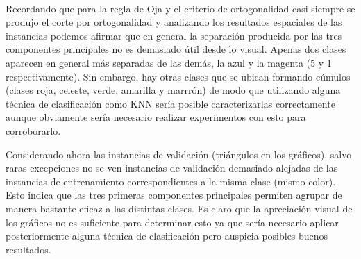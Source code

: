 \documentclass[informe.tex]{subfiles}
\begin{document}
	~
	
	Recordando que para la regla de Oja y el criterio de ortogonalidad casi siempre se produjo el corte por ortogonalidad y analizando los resultados espaciales de las instancias podemos afirmar que en general la separación producida por las tres componentes principales no es demasiado útil desde lo visual. Apenas dos clases aparecen en general más separadas de las demás, la azul y la magenta (5 y 1 respectivamente). Sin embargo, hay otras clases que se ubican formando cúmulos (clases roja, celeste, verde, amarilla y marrrón) de modo que utilizando alguna técnica de clasificación como KNN sería posible caracterizarlas correctamente aunque obviamente sería necesario realizar experimentos con esto para corroborarlo.
	
	Considerando ahora las instancias de validación (triángulos en los gráficos), salvo raras excepciones no se ven instancias de validación demasiado alejadas de las instancias de entrenamiento correspondientes a la misma clase (mismo color). Esto indica que las tres primeras componentes principales permiten agrupar de manera bastante eficaz a las distintas clases. Es claro que la apreciación visual de los gráficos no es suficiente para determinar esto ya que sería necesario aplicar posteriormente alguna técnica de clasificación pero auspicia posibles buenos resultados.
	
\end{document}
